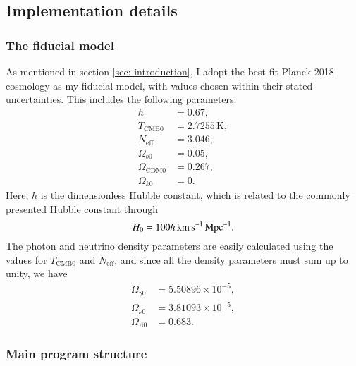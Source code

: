 \documentclass{aa}
\numberwithin{equation}{section}
\numberwithin{table}{section}
\numberwithin{figure}{section}
\begin{document}
\subsection{Implementation details}\label{subsec: I methods}
\subsubsection{The fiducial model}\label{subsubsec: I methods fiducial}
As mentioned in section \ref{sec: introduction}, I adopt the best-fit Planck 2018 cosmology \citep[see][]{Planck} as my fiducial model, with values chosen within their stated uncertainties. This includes the following parameters:
\begin{align*}
    h &= 0.67,
    \\
    T_{\text{CMB}0} &= 2.7255\,\text{K},
    \\
    N_\text{eff} &= 3.046,
    \\
    \Omega_{b0} &= 0.05,
    \\
    \Omega_{\text{CDM}0} &= 0.267,
    \\
    \Omega_{k0} &= 0.
\end{align*}
Here, $h$ is the dimensionless Hubble constant, which is related to the commonly presented Hubble constant through
\begin{equation}
    H_0 = 100h\,\text{km\,s}^{-1}\text{\,Mpc}^{-1}.
\end{equation}
The photon and neutrino density parameters are easily calculated using the values for $T_{\text{CMB}0}$ and $N_\text{eff}$, and since all the density parameters must sum up to unity, we have
\begin{align*}
  \Omega_{\gamma0} &= 5.50896\times10^{-5},
  \\
  \Omega_{\nu0} &=  3.81093\times10^{-5},
  \\
  \Omega_{\Lambda0} &= 0.683.
\end{align*}


\subsubsection{Main program structure}
\end{document}
